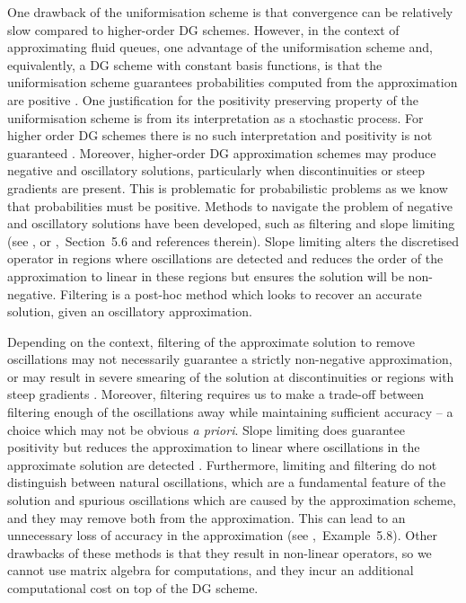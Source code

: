 One drawback of the uniformisation scheme is that convergence can be relatively slow compared to higher-order DG schemes. However, in the context of approximating fluid queues, one advantage of the uniformisation scheme and, equivalently, a DG scheme with constant basis functions, is that the uniformisation scheme guarantees probabilities computed from the approximation are positive \citep[Section~3.3]{koltai2011}. One justification for the positivity preserving property of the uniformisation scheme is from its interpretation as a stochastic process. For higher order DG schemes there is no such interpretation and positivity is not guaranteed \citep[Section~3.3]{koltai2011}. Moreover, higher-order DG approximation schemes may produce negative and oscillatory solutions, particularly when discontinuities or steep gradients are present. This is problematic for probabilistic problems as we know that probabilities must be positive. Methods to navigate the problem of negative and oscillatory solutions have been developed, such as filtering and slope limiting (see \cite{c99}, or \cite{nodalDGBook},~Section~5.6 and references therein). Slope limiting alters the discretised operator in regions where oscillations are detected and reduces the order of the approximation to linear in these regions but ensures the solution will be non-negative. Filtering is a post-hoc method which looks to recover an accurate solution, given an oscillatory approximation. 

Depending on the context, filtering of the approximate solution to remove oscillations may not necessarily guarantee a strictly non-negative approximation, or may result in severe smearing of the solution at discontinuities or regions with steep gradients \citep[Section~5.6.1]{nodalDGBook}. Moreover, filtering requires us to make a trade-off between filtering enough of the oscillations away while maintaining sufficient accuracy -- a choice which may not be obvious \emph{a priori}. Slope limiting does guarantee positivity but reduces the approximation to linear where oscillations in the approximate solution are detected \citep[Section~5.6.1]{nodalDGBook}. Furthermore, limiting and filtering do not distinguish between natural oscillations, which are a fundamental feature of the solution and spurious oscillations which are caused by the approximation scheme, and they may remove both from the approximation. This can lead to an unnecessary loss of accuracy in the approximation (see \citep{nodalDGBook},~Example~5.8). Other drawbacks of these methods is that they result in non-linear operators, so we cannot use matrix algebra for computations, and they incur an additional computational cost on top of the DG scheme.

